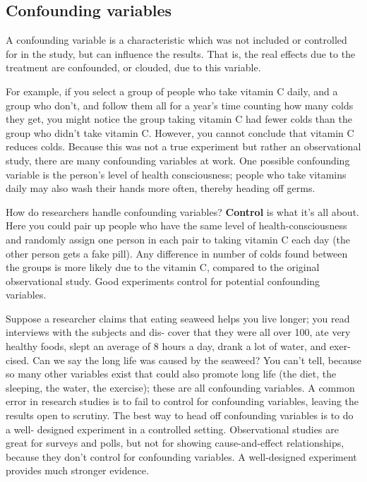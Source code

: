 \subsection*{Confounding variables}\label{sec:confounding}

A confounding variable is a characteristic which was not
included or controlled for in the study, but can influence the
results. That is, the real effects due to the treatment are confounded, or clouded, due to this variable.

For example, if you select a group of people who take vitamin C daily, and a group who don't, and follow them all for a year's
time counting how many colds they get, you might notice the
group taking vitamin C had fewer colds than the group who
didn't take vitamin C. However, you cannot conclude that vitamin C reduces colds. Because this was not a true experiment
but rather an observational study, there are many confounding variables at work. One possible confounding variable is
the person’s level of health consciousness; people who take
vitamins daily may also wash their hands more often, thereby
heading off germs.

How do researchers handle confounding variables? \textbf{Control}
is what it's all about. Here you could pair up people who
have the same level of health-consciousness and randomly
assign one person in each pair to taking vitamin C each day
(the other person gets a fake pill). Any difference in number
of colds found between the groups is more likely due to the vitamin C, compared to the original observational study. Good
experiments control for potential confounding variables. 

Suppose a researcher claims that eating seaweed helps you
live longer; you read interviews with the subjects and dis-
cover that they were all over 100, ate very healthy foods, slept
an average of 8 hours a day, drank a lot of water, and exer-
cised. Can we say the long life was caused by the seaweed?
You can’t tell, because so many other variables exist that
could also promote long life (the diet, the sleeping, the water,
the exercise); these are all confounding variables.
A common error in research studies is to fail to control for
confounding variables, leaving the results open to scrutiny.
The best way to head off confounding variables is to do a well-
designed experiment in a controlled setting.
Observational studies are great for surveys and polls, but not
for showing cause-and-effect relationships, because they don’t
control for confounding variables. A well-designed experiment
provides much stronger evidence.


